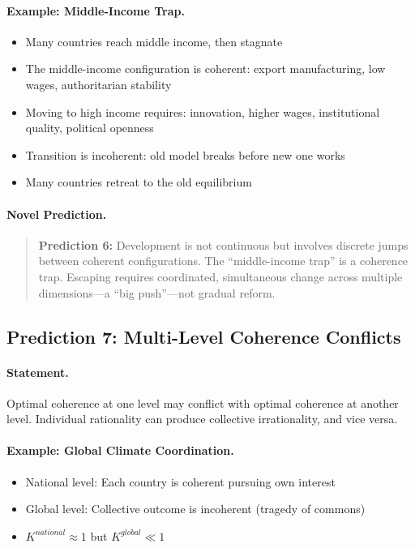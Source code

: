 \documentclass[12pt,a4paper]{article}
\begin{document}
\paragraph{Example: Middle-Income Trap.}
\begin{itemize}
  \item Many countries reach middle income, then stagnate
  \item The middle-income configuration is coherent: export manufacturing, 
        low wages, authoritarian stability
  \item Moving to high income requires: innovation, higher wages, 
        institutional quality, political openness
  \item Transition is incoherent: old model breaks before new one works
  \item Many countries retreat to the old equilibrium
\end{itemize}

\paragraph{Novel Prediction.}
\begin{quote}
\textbf{Prediction 6:} Development is not continuous but involves
discrete jumps between coherent configurations. The ``middle-income trap''
is a coherence trap. Escaping requires coordinated, simultaneous change
across multiple dimensions---a ``big push''---not gradual reform.
\end{quote}

\subsection{Prediction 7: Multi-Level Coherence Conflicts}

\paragraph{Statement.}
Optimal coherence at one level may conflict with optimal coherence
at another level. Individual rationality can produce collective irrationality,
and vice versa.

\paragraph{Example: Global Climate Coordination.}
\begin{itemize}
  \item National level: Each country is coherent pursuing own interest
  \item Global level: Collective outcome is incoherent (tragedy of commons)
  \item $K^{national} \approx 1$ but $K^{global} \ll 1$
\end{itemize}
\end{document}
